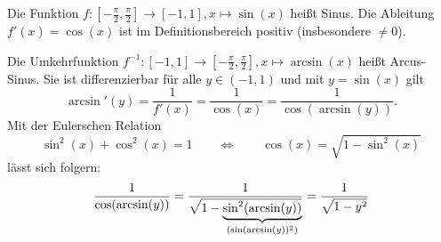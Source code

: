 Die Funktion $f: \left[-\frac{\pi}{2}, \frac{\pi}{2}\right] \to [-1, 1], x \mapsto \sin (x)$ heißt Sinus. Die Ableitung $f'(x) = \cos (x)$ ist im Definitionsbereich positiv (insbesondere $\neq 0$). \par
Die Umkehrfunktion $f^{-1}: [-1, 1] \to \left[-\frac{\pi}{2}, \frac{\pi}{2}\right], x \mapsto \arcsin (x)$ heißt Arcus-Sinus. Sie ist differenzierbar für alle $y \in (-1, 1)$ und mit $y = \sin (x)$ gilt
$$\arcsin ' (y) = \frac{1}{f'(x)} = \frac{1}{\cos (x)} = \frac{1}{\cos(\arcsin(y))}.$$
Mit der Eulerschen Relation 
$$\sin^2(x)+\cos^2(x) = 1 \qquad \Longleftrightarrow \qquad \cos(x) = \sqrt{1-\sin^2(x)}$$
lässt sich folgern:
$$\frac{1}{\cos(\arcsin(y))} = \frac{1}{\sqrt{1-\smash[b]{\underbrace{\sin^2(\arcsin(y))}_{(\sin(\arcsin(y))^2)}}}} = \frac{1}{\sqrt{1-y^2}}$$